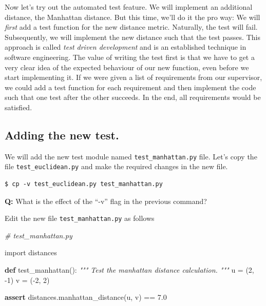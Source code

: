 \documentclass[11pt]{article}
\newenvironment{Shaded}{}{}
\newcommand{\KeywordTok}[1]{\textcolor[rgb]{0.00,0.44,0.13}{\textbf{{#1}}}}
\newcommand{\DecValTok}[1]{\textcolor[rgb]{0.25,0.63,0.44}{{#1}}}
\newcommand{\FloatTok}[1]{\textcolor[rgb]{0.25,0.63,0.44}{{#1}}}
\newcommand{\CommentTok}[1]{\textcolor[rgb]{0.38,0.63,0.69}{\textit{{#1}}}}
\newcommand{\NormalTok}[1]{{#1}}
\newcommand{\ImportTok}[1]{{#1}}
\newcommand{\ControlFlowTok}[1]{\textcolor[rgb]{0.00,0.44,0.13}{\textbf{{#1}}}}
\newcommand{\OperatorTok}[1]{\textcolor[rgb]{0.40,0.40,0.40}{{#1}}}
\begin{document}
    Now let's try out the automated test feature. We will implement an
additional distance, the Manhattan distance. But this time, we'll do it
the pro way: We will \emph{first} add a test function for the new
distance metric. Naturally, the test will fail. Subsequently, we will
implement the new distance such that the test passes. This approach is
called \emph{test driven development} and is an established technique in
software engineering. The value of writing the test first is that we
have to get a very clear idea of the expected behaviour of our new
function, even before we start implementing it. If we were given a list
of requirements from our supervisor, we could add a test function for
each requirement and then implement the code such that one test after
the other succeeds. In the end, all requirements would be satisfied.

    \hypertarget{adding-the-new-test.}{%
\subsection{Adding the new test.}\label{adding-the-new-test.}}

We will add the new test module named \texttt{test\_manhattan.py} file.
Let's copy the file \texttt{test\_euclidean.py} and make the required
changes in the new file.

\begin{verbatim}
$ cp -v test_euclidean.py test_manhattan.py
\end{verbatim}

\textbf{Q:} What is the effect of the ``-v'' flag in the previous
command?

    Edit the new file \texttt{test\_manhattan.py} as follows

\begin{Shaded}
\begin{Highlighting}[]
\CommentTok{\# test\_manhattan.py}

\ImportTok{import}\NormalTok{ distances}

\KeywordTok{def}\NormalTok{ test\_manhattan():}
    \CommentTok{""" Test the manhattan distance calculation. """}
\NormalTok{    u }\OperatorTok{=}\NormalTok{ (}\DecValTok{2}\NormalTok{, }\OperatorTok{{-}}\DecValTok{1}\NormalTok{)}
\NormalTok{    v }\OperatorTok{=}\NormalTok{ (}\OperatorTok{{-}}\DecValTok{2}\NormalTok{, }\DecValTok{2}\NormalTok{)}

    \ControlFlowTok{assert}\NormalTok{ distances.manhattan\_distance(u, v) }\OperatorTok{==} \FloatTok{7.0}
\end{Highlighting}
\end{Shaded}
\end{document}
